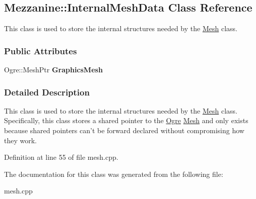 \hypertarget{classMezzanine_1_1InternalMeshData}{
\subsection{Mezzanine::InternalMeshData Class Reference}
\label{classMezzanine_1_1InternalMeshData}
}


This class is used to store the internal structures needed by the \hyperlink{classMezzanine_1_1Mesh}{Mesh} class.  


\subsubsection*{Public Attributes}
\begin{DoxyCompactItemize}
\item 
\hypertarget{classMezzanine_1_1InternalMeshData_aefe57342f8cc5c8f48fc59c2bed9bd58}{
Ogre::MeshPtr {\bfseries GraphicsMesh}}
\label{classMezzanine_1_1InternalMeshData_aefe57342f8cc5c8f48fc59c2bed9bd58}

\end{DoxyCompactItemize}


\subsubsection{Detailed Description}
This class is used to store the internal structures needed by the \hyperlink{classMezzanine_1_1Mesh}{Mesh} class. Specifically, this class stores a shared pointer to the \hyperlink{namespaceOgre}{Ogre} \hyperlink{classMezzanine_1_1Mesh}{Mesh} and only exists because shared pointers can't be forward declared without compromising how they work. 

Definition at line 55 of file mesh.cpp.



The documentation for this class was generated from the following file:\begin{DoxyCompactItemize}
\item 
mesh.cpp\end{DoxyCompactItemize}
